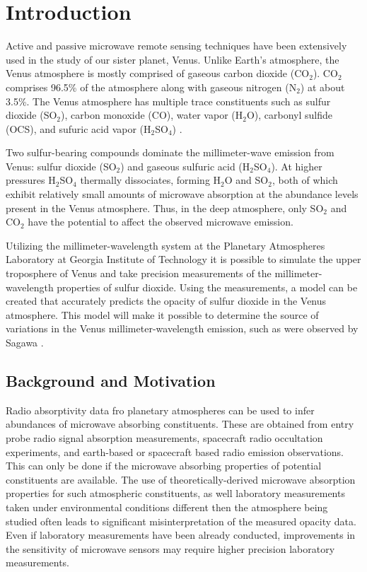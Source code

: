 \chapter{Introduction}

Active and passive microwave remote sensing techniques have been extensively used in the study of our sister planet, Venus. Unlike Earth's atmosphere, the Venus atmosphere is mostly comprised of gaseous carbon dioxide (CO$_2$). CO$_2$ comprises 96.5\% of the atmosphere along with gaseous nitrogen (N$_2$) at about 3.5\%. The Venus atmosphere has multiple trace constituents such as sulfur dioxide (SO$_2$), carbon monoxide (CO), water vapor (H$_2$O), carbonyl sulfide (OCS), and sufuric acid vapor (H$_2$SO$_4$) \cite{Suleiman-thesis}.

Two sulfur-bearing compounds dominate the millimeter-wave emission from Venus: sulfur dioxide (SO$_2$) and gaseous sulfuric acid (H$_2$SO$_4$). At higher pressures H$_2$SO$_4$ thermally dissociates, forming H$_2$O and SO$_2$, both of which exhibit relatively small amounts of microwave absorption at the abundance levels present in the Venus atmosphere. Thus, in the deep atmosphere, only SO$_2$ and CO$_2$ have the potential to affect the observed microwave emission.

Utilizing the millimeter-wavelength system at the Planetary Atmospheres Laboratory at Georgia Institute of Technology it is possible to simulate the upper troposphere of Venus and take precision measurements of the millimeter-wavelength properties of sulfur dioxide. Using the measurements, a model can be created that accurately predicts the opacity of sulfur dioxide in the Venus atmosphere. This model will make it possible to determine the source of variations in the Venus millimeter-wavelength emission, such as were observed by Sagawa \cite{observations}.

\section{Background and Motivation}

Radio absorptivity data fro planetary atmospheres can be used to infer abundances of microwave absorbing constituents. These are obtained from entry probe radio signal absorption measurements, spacecraft radio occultation experiments, and earth-based or spacecraft based radio emission observations. This can only be done if the microwave absorbing properties of potential constituents are available. The use of theoretically-derived microwave absorption properties for such atmospheric constituents, as well laboratory measurements taken under environmental conditions different then the atmosphere being studied often leads to significant misinterpretation of the measured opacity data. Even if laboratory measurements have been already conducted, improvements in the sensitivity of microwave sensors may require higher precision laboratory measurements. 

